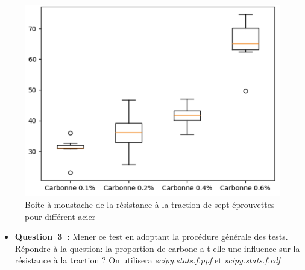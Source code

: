 \begin{itemize}
\begin{figure}[!h]
\begin{minipage}{.48\linewidth}
            \end{minipage}\hfill
            \begin{minipage}{.48\linewidth}
                \begin{center}
                    \includegraphics[width=.9\textwidth]{img/figure1.png}
                    \caption{\label{fig:figure1}Boite à moustache de la résistance à la traction de sept éprouvettes pour différent acier}
                \end{center}
            \end{minipage}
        \end{figure}
\end{itemize}


\vspace{.5cm}
\begin{itemize}[label={},itemindent=-2em,leftmargin=2em]
    \item \textbf{Question~3~:} Mener ce test en adoptant la procédure générale des tests. Répondre à la question: la
    proportion de carbone a-t-elle une influence sur la résistance à la traction ? On utilisera \textit{scipy.stats.f.ppf} et \textit{scipy.stats.f.cdf}
\end{itemize}
\vspace{.2cm}


